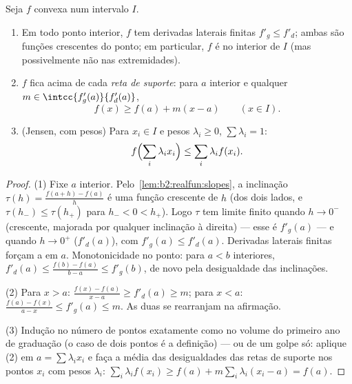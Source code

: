 \begin{theorem}\label{thm:b2:realfun:convexreg}
Seja $f$ convexa num intervalo $I$.
\begin{enumerate}
  \item Em todo ponto interior, $f$ tem derivadas laterais
        finitas $f'_g \leq f'_d$; ambas são funções crescentes
        do ponto; em particular, $f$ é  no
        interior de $I$ (mas possivelmente não nas extremidades).
  \item $f$ fica acima de cada \emph{reta de suporte}: para $a$ interior
        e qualquer $m \in \intcc{f'_g(a)}{f'_d(a)}$,
        \[
        f(x) \geq f(a) + m(x - a) \qquad (x \in I).
        \]
  \item (Jensen, com pesos) Para $x_i \in I$ e pesos $\lambda_i
        \geq 0$, $\sum\lambda_i = 1$:
        \[
        f\Bigl(\sum_i \lambda_i x_i\Bigr) \leq \sum_i \lambda_i
        f(x_i) .\index{desigualdade de Jensen}
        \]
\end{enumerate}
\end{theorem}

\begin{proof}
(1) Fixe $a$ interior. Pelo~\cref{lem:b2:realfun:slopes}, a inclinação
$\tau(h) = \frac{f(a + h) - f(a)}{h}$ é uma função crescente de
$h$ (dos dois lados, e $\tau(h_-) \leq \tau(h_+)$ para $h_- < 0 <
h_+$). Logo $\tau$ tem limite finito quando $h \to 0^-$ (crescente,
majorada por qualquer inclinação à direita) --- esse é $f'_g(a)$ --- e quando
$h \to 0^+$ ($f'_d(a)$), com $f'_g(a) \leq f'_d(a)$. Derivadas laterais
finitas forçam a  em $a$. Monotonicidade no
ponto: para $a < b$ interiores, $f'_d(a) \leq \frac{f(b) - f(a)}{b -
a} \leq f'_g(b)$, de novo pela desigualdade das inclinações.

(2) Para $x > a$: $\frac{f(x) - f(a)}{x - a} \geq f'_d(a) \geq m$;
para $x < a$: $\frac{f(a) - f(x)}{a - x} \leq f'_g(a) \leq m$. As duas
se rearranjam na afirmação.

(3) Indução no número de pontos exatamente como no volume do primeiro
ano de graduação (o caso de dois pontos é a definição) --- ou de um golpe só:
aplique (2) em $a = \sum\lambda_i x_i$ e faça a média das desigualdades das retas
de suporte nos pontos $x_i$ com pesos $\lambda_i$: $\sum_i
\lambda_i f(x_i) \geq f(a) + m\sum_i\lambda_i(x_i - a) = f(a)$.
\end{proof}

